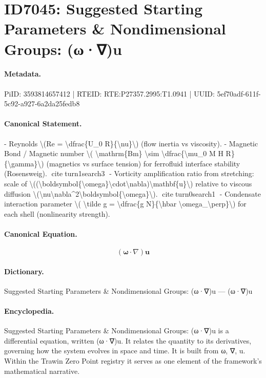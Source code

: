 \section*{ID7045: Suggested Starting Parameters \& Nondimensional Groups: (ω·∇)u}
\paragraph{Metadata.}
PiID: 3593814657412 | RTEID: RTE:P27357.2995:T1.0941 | UUID: 5ef70adf-611f-5c92-a927-6a2da25fedb8

\paragraph{Canonical Statement.}
- Reynolds \textbackslash{}(Re = \textbackslash{}dfrac\{U\_0 R\}\{\textbackslash{}nu\}\textbackslash{}) (flow inertia vs viscosity). - Magnetic Bond / Magnetic number \textbackslash{}( \textbackslash{}mathrm\{Bm\} \textbackslash{}sim \textbackslash{}dfrac\{\textbackslash{}mu\_0 M H R\}\{\textbackslash{}gamma\}\textbackslash{}) (magnetics vs surface tension) for ferrofluid interface stability (Rosensweig). citeturn1search3 - Vorticity amplification ratio from stretching: scale of \textbackslash{}((\textbackslash{}boldsymbol\{\textbackslash{}omega\}\textbackslash{}cdot\textbackslash{}nabla)\textbackslash{}mathbf\{u\}\textbackslash{}) relative to viscous diffusion \textbackslash{}(\textbackslash{}nu\textbackslash{}nabla\textasciicircum{}2\textbackslash{}boldsymbol\{\textbackslash{}omega\}\textbackslash{}). citeturn0search1 - Condensate interaction parameter \textbackslash{}( \textbackslash{}tilde g = \textbackslash{}dfrac\{g N\}\{\textbackslash{}hbar \textbackslash{}omega\_\textbackslash{}perp\}\textbackslash{}) for each shell (nonlinearity strength).

\paragraph{Canonical Equation.}
\[
(\boldsymbol{\omega}\cdot\nabla)\mathbf{u}
\]

\paragraph{Dictionary.}
Suggested Starting Parameters \& Nondimensional Groups: (ω·∇)u — (ω·∇)u

\paragraph{Encyclopedia.}
Suggested Starting Parameters \& Nondimensional Groups: (ω·∇)u is a differential equation, written (ω·∇)u. It relates the quantity to its derivatives, governing how the system evolves in space and time. It is built from ω, ∇, u. Within the Trawin Zero Point registry it serves as one element of the framework's mathematical narrative.
